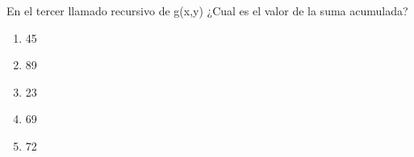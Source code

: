 {
En el tercer llamado recursivo de g(x,y) ¿Cual es el valor de la suma acumulada?
\begin{enumerate}
	\item 45
	\item 89
	\item 23
	\item 69 %
	\item 72
\end{enumerate}
}
